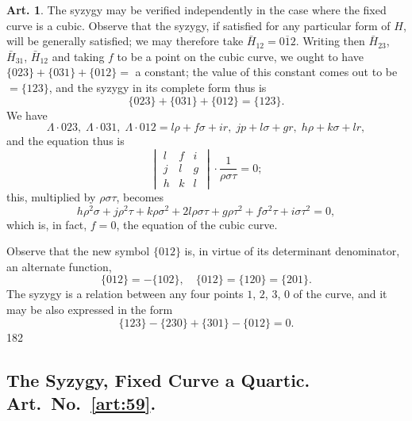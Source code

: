 \documentclass[12pt,a4paper]{article}
\theoremstyle{definition}
\newtheorem{art}{Art.}[section]
\begin{document}
\begin{art}\label{art:58}
The syzygy may be verified independently in the case where the fixed curve is a cubic. Observe that the syzygy, if satisfied for any particular form of $H$, will be generally satisfied; we may therefore take $\bar{H}_{12} = \overline{012}$. Writing then $\bar{H}_{23}$, $\bar{H}_{31}$, $\bar{H}_{12}$ and taking $f$ to be a point on the cubic curve, we ought to have $\{023\} + \{031\} + \{012\} = $ a constant; the value of this constant comes out to be $= \{123\}$, and the syzygy in its complete form thus is
\[
\{023\} + \{031\} + \{012\} = \{123\}.
\]
We have
\[
\Lambda \cdot 023,\; \Lambda \cdot 031,\; \Lambda \cdot 012 = l\rho + f\sigma + ir,\; jp + l\sigma + gr,\; h\rho + k\sigma + lr,
\]
and the equation thus is
\[
\begin{vmatrix}
l & f & i \\
j & l & g \\
h & k & l
\end{vmatrix} \cdot \frac{1}{\rho\sigma\tau} = 0;
\]
this, multiplied by $\rho\sigma\tau$, becomes
\[
h\rho^2\sigma + j\rho^2\tau + k\rho\sigma^2 + 2l\rho\sigma\tau + g\rho\tau^2 + f\sigma^2\tau + i\sigma\tau^2 = 0,
\]
which is, in fact, $f = 0$, the equation of the cubic curve.

Observe that the new symbol $\{012\}$ is, in virtue of its determinant denominator, an alternate function,
\[
\{012\} = -\{102\}, \quad \{012\} = \{120\} = \{201\}.
\]
The syzygy is a relation between any four points $1$, $2$, $3$, $0$ of the curve, and it may be also expressed in the form
\[
\{123\} - \{230\} + \{301\} - \{012\} = 0.
\]
182
\end{art}

\newpage
\subsection*{The Syzygy, Fixed Curve a Quartic. Art.~No.~\ref{art:59}.}
\end{document}
